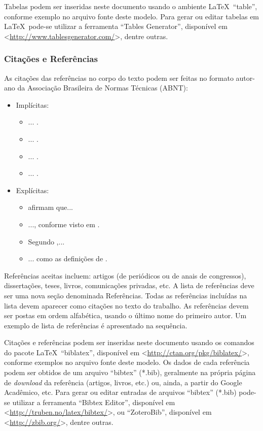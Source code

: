 \documentclass[%
  report,%
  10pt,%
  a4paper,%
  fleqn,%
  oneside,%
  sumario = tradicional,%
  chapter = TITLE,%
  section = TITLE,%
]{abntex2}
\begin{document}
Tabelas podem ser inseridas neste documento usando o ambiente \LaTeX\ ``table'', conforme exemplo no arquivo fonte deste modelo. Para gerar ou editar tabelas em \LaTeX\ pode-se utilizar a ferramenta ``Tables Generator'', disponível em <\url{http://www.tablesgenerator.com/}>, dentre outras.

\subsubsection{Citações e Referências}\label{sssec:citref}

As citações das referências no corpo do texto podem ser feitas no formato autor-ano da Associação Brasileira de Normas Técnicas (ABNT):

\begin{itemize}
\item Implícitas:
\begin{itemize}
\item ... \cite{VanEkenstein1997}.
\item ... \cite{Coleman1991,Nriagu1988}.
\item ... \cite{Wizentier1992,Faina2000,Larsson2018}.
\item ... \cite{VanEkenstein1997,Nriagu1988,Faina2000}.
\end{itemize}
\item Explícitas:
\begin{itemize}
\item \textcite{VanEkenstein1997} afirmam que...
\item ..., conforme visto em \textcite{Coleman1991,Nriagu1988}.
\item Segundo \textcite{Wizentier1992,Faina2000,Larsson2018},...
\item ... como as definições de \textcite{VanEkenstein1997,Nriagu1988,Faina2000}.
\end{itemize}
\end{itemize}

Referências aceitas incluem: artigos (de periódicos ou de anais de congressos), dissertações, teses, livros, comunicações privadas, etc. A lista de referências deve ser uma nova seção denominada Referências. Todas as referências incluídas na lista devem aparecer como citações no texto do trabalho. As referências devem ser postas em ordem alfabética, usando o último nome do primeiro autor. Um exemplo de lista de referências é apresentado na sequência.

Citações e referências podem ser inseridas neste documento usando os comandos do pacote \LaTeX\ ``biblatex'', disponível em <\url{http://ctan.org/pkg/biblatex/}>, conforme exemplos no arquivo fonte deste modelo. Os dados de cada referência podem ser obtidos de um arquivo ``bibtex'' (*.bib), geralmente na própria página de \textit{download} da referência (artigos, livros, etc.) ou, ainda, a partir do Google Acadêmico, etc. Para gerar ou editar entradas de arquivos ``bibtex'' (*.bib) pode-se utilizar a ferramenta ``Bibtex Editor'', disponível em <\url{http://truben.no/latex/bibtex/}>, ou ``ZoteroBib'', disponível em <\url{http://zbib.org/}>, dentre outras.
\end{document}
